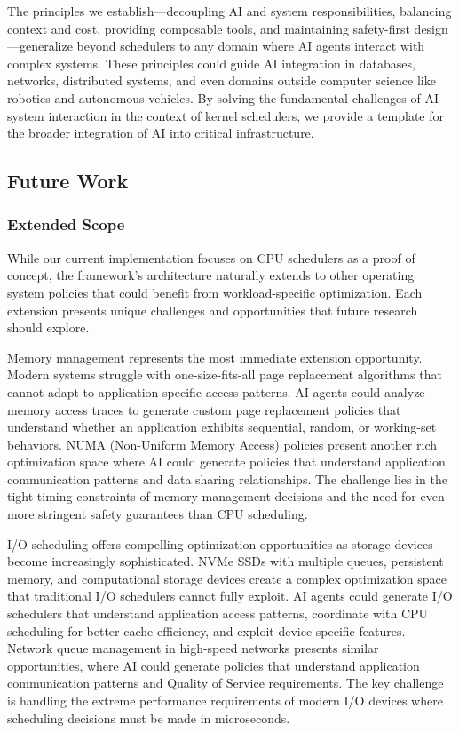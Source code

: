The principles we establish—decoupling AI and system responsibilities, balancing context and cost, providing composable tools, and maintaining safety-first design—generalize beyond schedulers to any domain where AI agents interact with complex systems. These principles could guide AI integration in databases, networks, distributed systems, and even domains outside computer science like robotics and autonomous vehicles. By solving the fundamental challenges of AI-system interaction in the context of kernel schedulers, we provide a template for the broader integration of AI into critical infrastructure.

\subsection{Future Work}

\subsubsection{Extended Scope}
While our current implementation focuses on CPU schedulers as a proof of concept, the framework's architecture naturally extends to other operating system policies that could benefit from workload-specific optimization. Each extension presents unique challenges and opportunities that future research should explore.

Memory management represents the most immediate extension opportunity. Modern systems struggle with one-size-fits-all page replacement algorithms that cannot adapt to application-specific access patterns. AI agents could analyze memory access traces to generate custom page replacement policies that understand whether an application exhibits sequential, random, or working-set behaviors. NUMA (Non-Uniform Memory Access) policies present another rich optimization space where AI could generate policies that understand application communication patterns and data sharing relationships. The challenge lies in the tight timing constraints of memory management decisions and the need for even more stringent safety guarantees than CPU scheduling.

I/O scheduling offers compelling optimization opportunities as storage devices become increasingly sophisticated. NVMe SSDs with multiple queues, persistent memory, and computational storage devices create a complex optimization space that traditional I/O schedulers cannot fully exploit. AI agents could generate I/O schedulers that understand application access patterns, coordinate with CPU scheduling for better cache efficiency, and exploit device-specific features. Network queue management in high-speed networks presents similar opportunities, where AI could generate policies that understand application communication patterns and Quality of Service requirements. The key challenge is handling the extreme performance requirements of modern I/O devices where scheduling decisions must be made in microseconds.

